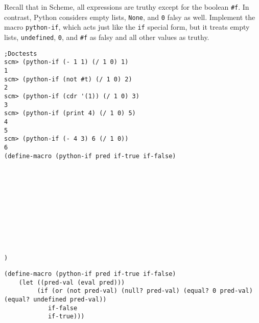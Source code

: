 \begin{blocksection}
\question Recall that in Scheme, all expressions are truthy except for the boolean \lstinline{#f}. In contrast, Python considers empty lists, \lstinline{None}, and \lstinline{0} falsy as well. Implement the macro \lstinline{python-if}, which acts just like the \lstinline{if} special form, but it treats empty lists, \lstinline{undefined}, \lstinline{0}, and \lstinline{#f} as falsy and all other values as truthy. 

\begin{lstlisting}
;Doctests
scm> (python-if (- 1 1) (/ 1 0) 1)
1
scm> (python-if (not #t) (/ 1 0) 2)
2
scm> (python-if (cdr '(1)) (/ 1 0) 3)
3
scm> (python-if (print 4) (/ 1 0) 5)
4
5
scm> (python-if (- 4 3) 6 (/ 1 0))
6
(define-macro (python-if pred if-true if-false)











)
\end{lstlisting}
\end{blocksection}

\begin{solution}
\begin{lstlisting}
(define-macro (python-if pred if-true if-false)
    (let ((pred-val (eval pred)))
         (if (or (not pred-val) (null? pred-val) (equal? 0 pred-val) (equal? undefined pred-val))
            if-false
            if-true)))
\end{lstlisting}
\end{solution}
